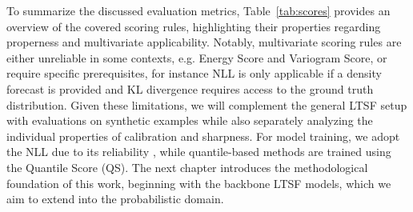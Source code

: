 \documentclass[a4paper,oneside,bibliography=totoc]{scrbook}
\begin{document}
\newline

\noindent
To summarize the discussed evaluation metrics, Table~\ref{tab:scores} provides an overview of the covered scoring rules, highlighting their properties regarding properness and multivariate applicability. 
Notably, multivariate scoring rules are either unreliable in some contexts, e.g. Energy Score and Variogram Score, or  require specific prerequisites, for instance NLL is only applicable if a density forecast is provided and KL divergence requires access to the ground truth distribution.
Given these limitations, we will complement the general LTSF setup with evaluations on synthetic examples while also separately analyzing the individual properties of calibration and sharpness. 
For model training, we adopt the NLL due to its reliability \cite{marcotte_regions_2023}, while quantile-based methods are trained using the Quantile Score (QS).
The next chapter introduces the methodological foundation of this work, beginning with the backbone LTSF models, which we aim to extend into the probabilistic domain.
\end{document}
